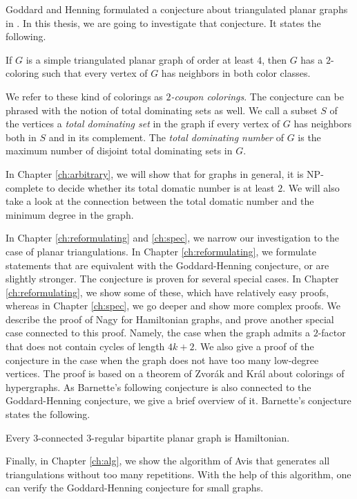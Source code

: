 Goddard and Henning formulated a conjecture about triangulated planar graphs in \cite{gh}.
In this thesis, we are going to investigate that conjecture. It states the following.

\begin{conj*}
  If $G$ is a simple triangulated planar graph of order at least $4$, then $G$ has
  a $2$-coloring such that every vertex of $G$ has neighbors in both color classes.
\end{conj*}

We refer to these kind of colorings as \emph{$2$-coupon colorings}. The conjecture can
be phrased with the notion of total dominating sets as well. We call a subset $S$ of
the vertices a \emph{total dominating set} in the graph if every vertex of $G$ has neighbors both in
$S$ and in its complement. The \emph{total dominating number} of $G$ is the maximum number
of disjoint total dominating sets in $G$.

In Chapter \ref{ch:arbitrary}, we will show that for graphs in general, it is NP-complete
to decide whether its total domatic number is at least $2$. We will also take a look
at the connection between the total domatic number and the minimum degree in the graph.

In Chapter \ref{ch:reformulating} and \ref{ch:spec}, we narrow our investigation to
the case of planar triangulations. In Chapter \ref{ch:reformulating}, we formulate
statements that are equivalent with the Goddard-Henning conjecture, or are slightly stronger.
The conjecture is proven for several special cases. In Chapter \ref{ch:reformulating}, we show
some of these, which have relatively easy proofs, whereas in Chapter \ref{ch:spec}, we go deeper
and show more complex proofs. We describe the proof of Nagy \cite{outerplanar} for Hamiltonian graphs,
and prove another special case connected to this proof. Namely, the case when the graph admits
a $2$-factor that does not contain cycles of length $4k +2$. We also give a proof of
the conjecture in the case when the graph does not have too many low-degree vertices.
The proof is based on a theorem of Zvorák and Král \cite{hypergraph} about colorings of hypergraphs.
As Barnette's \cite{barnette} following conjecture is also connected to the Goddard-Henning conjecture,
we give a brief overview of it. Barnette's conjecture states the following.

\begin{conj*}
  Every $3$-connected $3$-regular bipartite planar graph is Hamiltonian.
\end{conj*}

Finally, in Chapter \ref{ch:alg}, we show the algorithm of Avis that generates all
triangulations without too many repetitions. With the help of this algorithm, one
can verify the Goddard-Henning conjecture for small graphs.
